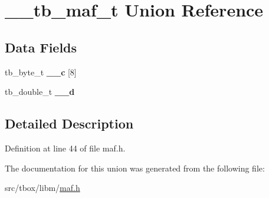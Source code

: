 \hypertarget{union____tb__maf__t}{\section{\-\_\-\-\_\-tb\-\_\-maf\-\_\-t Union Reference}
\label{union____tb__maf__t}
}
\subsection*{Data Fields}
\begin{DoxyCompactItemize}
\item 
\hypertarget{union____tb__maf__t_ab4b743b6603f7441144be44ec1e041cc}{tb\-\_\-byte\-\_\-t {\bfseries \-\_\-\-\_\-c} \mbox{[}8\mbox{]}}\label{union____tb__maf__t_ab4b743b6603f7441144be44ec1e041cc}

\item 
\hypertarget{union____tb__maf__t_a0d49ad816368dd545d2b20dfd733eb6a}{tb\-\_\-double\-\_\-t {\bfseries \-\_\-\-\_\-d}}\label{union____tb__maf__t_a0d49ad816368dd545d2b20dfd733eb6a}

\end{DoxyCompactItemize}


\subsection{Detailed Description}


Definition at line 44 of file maf.\-h.



The documentation for this union was generated from the following file\-:\begin{DoxyCompactItemize}
\item 
src/tbox/libm/\hyperlink{maf_8h}{maf.\-h}\end{DoxyCompactItemize}
